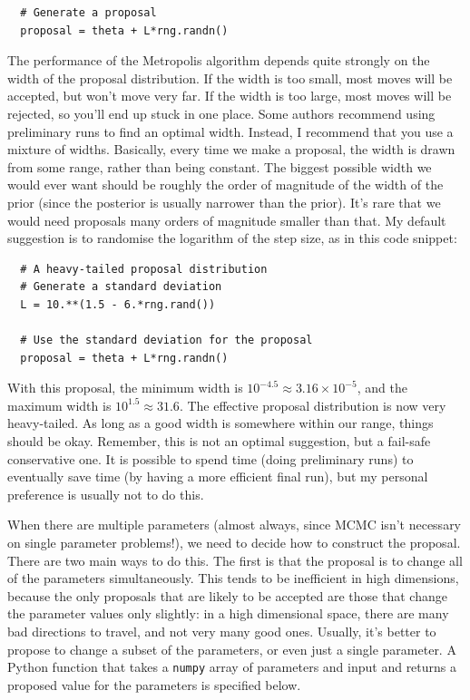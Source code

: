 \begin{verbatim}
  # Generate a proposal
  proposal = theta + L*rng.randn()
\end{verbatim}

The performance of the Metropolis algorithm depends quite strongly on
the width of the proposal distribution. If the width is too small, most moves
will be accepted, but won't move very far. If the width is too large, most
moves will be rejected, so you'll end up stuck in one place. Some authors
recommend using preliminary runs to find an optimal width. Instead, I recommend
that you use a mixture of widths. Basically, every time we make a proposal,
the width is drawn from some range, rather than being constant. The biggest
possible width we would ever want should be roughly the order of magnitude of
the width of the prior (since the posterior is usually narrower than the
prior). It's rare that we would need proposals many orders of magnitude
smaller than that. My default suggestion is to randomise the logarithm of
the step size, as in this code snippet:
\begin{verbatim}
  # A heavy-tailed proposal distribution
  # Generate a standard deviation
  L = 10.**(1.5 - 6.*rng.rand())

  # Use the standard deviation for the proposal
  proposal = theta + L*rng.randn()
\end{verbatim}
With this proposal, the minimum width is
$10^{-4.5} \approx 3.16 \times 10^{-5}$, and the maximum width is
$10^{1.5} \approx 31.6$. The effective proposal distribution is now very heavy-tailed. As long as a good width is somewhere within our range, things should be
okay. Remember, this is not an optimal suggestion, but a fail-safe conservative
one. It is possible to spend time (doing preliminary runs) to eventually save
time (by having a more efficient final run), but my personal preference is
usually not to do this.

When there are multiple parameters (almost always, since MCMC isn't necessary
on single parameter problems!), we need to decide how to construct the proposal.
There are two main ways to do this. The first is that the proposal is to
change all of the parameters simultaneously. This tends to be inefficient in
high dimensions, because the only proposals that are likely to be accepted
are those that change the parameter values only slightly: in a high dimensional
space, there are many bad directions to travel, and not very many good ones.
Usually, it's better to propose to change a subset of the parameters, or even
just a single parameter. A Python function that takes a {\tt numpy} array of
parameters and input and returns a proposed value for the parameters is
specified below.

